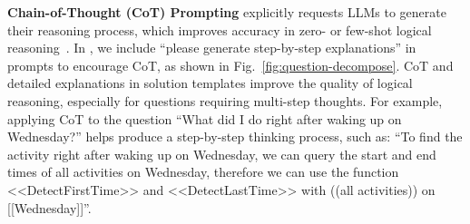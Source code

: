 

\textbf{Chain-of-Thought (CoT) Prompting} explicitly requests LLMs to generate their reasoning process, which improves accuracy in zero- or few-shot logical reasoning~\cite{chuCoTReasoningSurvey2024,lu2022learn}. In \Method, we include ``please generate step-by-step explanations'' in prompts to encourage CoT, as shown in Fig.~\ref{fig:question-decompose}.
CoT and detailed explanations in solution templates improve the quality of logical reasoning, especially for questions requiring multi-step thoughts.
For example, applying CoT to the question ``What did I do right after waking up on Wednesday?'' helps produce a step-by-step thinking process, such as: ``To find the activity right after waking up on Wednesday, we can query the start and end times of all activities on Wednesday, therefore we can use the function <<DetectFirstTime>> and <<DetectLastTime>> with ((all activities)) on [[Wednesday]]''.

